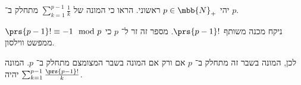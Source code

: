\documentclass[a4paper,10pt,twoside,openany]{book}
\begin{document}
\begin{exercisechap}
יהי
$p \in \mbb{N}_+$
ראשוני.
הראו כי המונה של
$\sum_{k = 1}^{p-1} \frac{1}{k}$
מתחלק ב־%
$p$.
\end{exercisechap}

\begin{solution}
ניקח מכנה משותף
$\prs{p-1}!$.
מספר זה זר ל־%
$p$
כי
$\prs{p-1}! \equiv -1 \mod{p}$
ממפשט ווילסון.

לכן, המונה בשבר זה מתחלק ב־%
$p$
אם ורק אם המונה בשבר המצומצם מתחלק ב־%
$p$.
המונה יהיה
$\sum_{k = 1}^{p-1} \frac{\prs{p-1}!}{k}$.
\end{solution}

\printbibliography
\end{document}
